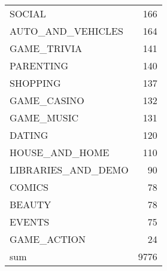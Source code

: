 \begin{tabular}{lr}
SOCIAL              &  166 \\
AUTO\_AND\_VEHICLES   &  164 \\
GAME\_TRIVIA         &  141 \\
PARENTING           &  140 \\
SHOPPING            &  137 \\
GAME\_CASINO         &  132 \\
GAME\_MUSIC          &  131 \\
DATING              &  120 \\
HOUSE\_AND\_HOME      &  110 \\
LIBRARIES\_AND\_DEMO  &  90 \\
COMICS              &  78 \\
BEAUTY              &  78 \\
EVENTS              &  75 \\
GAME\_ACTION         &  24 \\
sum                 &  9776 \\
\bottomrule
\end{tabular}
